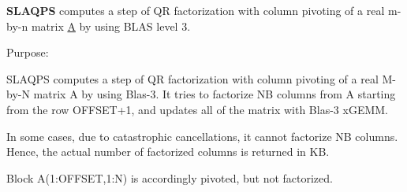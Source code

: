 {\bfseries S\+L\+A\+Q\+P\+S} computes a step of Q\+R factorization with column pivoting of a real m-\/by-\/n matrix \hyperlink{classA}{A} by using B\+L\+A\+S level 3. 

 \begin{DoxyParagraph}{Purpose\+: }
\begin{DoxyVerb} SLAQPS computes a step of QR factorization with column pivoting
 of a real M-by-N matrix A by using Blas-3.  It tries to factorize
 NB columns from A starting from the row OFFSET+1, and updates all
 of the matrix with Blas-3 xGEMM.

 In some cases, due to catastrophic cancellations, it cannot
 factorize NB columns.  Hence, the actual number of factorized
 columns is returned in KB.

 Block A(1:OFFSET,1:N) is accordingly pivoted, but not factorized.\end{DoxyVerb}
 
\end{DoxyParagraph}

